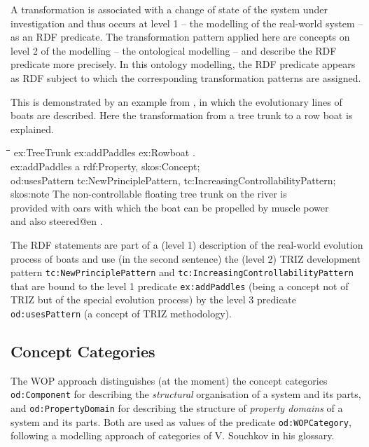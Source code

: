 \documentclass[11pt,a4paper]{article}
\newenvironment{code}{\tt \begin{tabbing}
\hskip12pt\=\hskip12pt\=\hskip12pt\=\hskip12pt\=\hskip5cm\=\hskip5cm\=\kill}
{\end{tabbing}}
\def\dq{{\char34}}
\begin{document}
A transformation is associated with a change of state of the system under
investigation and thus occurs at level 1 -- the modelling of the real-world
system -- as an RDF predicate. The transformation pattern applied here are
concepts on level 2 of the modelling -- the ontological modelling -- and
describe the RDF predicate more precisely. In this ontology modelling, the RDF
predicate appears as RDF subject to which the corresponding transformation
patterns are assigned.

This is demonstrated by an example from \cite[Fig. 4.20]{Koltze2017}, in which
the evolutionary lines of boats are described.  Here the transformation from a
tree trunk to a row boat is explained. 
\begin{code}
  ex:TreeTrunk ex:addPaddles ex:Rowboat .\\[4pt]

  ex:addPaddles a rdf:Property, skos:Concept;\\
  \>od:usesPattern tc:NewPrinciplePattern,
  tc:IncreasingControllabilityPattern;  \\
  \> skos:note {\dq}{\dq}{\dq}The non-controllable floating tree trunk on the
  river is \\\>\>provided with oars with which the boat can be propelled by
  muscle power \\\>\> and also steered{\dq}{\dq}{\dq}@en .
\end{code}
The RDF statements are part of a (level 1) description of the real-world
evolution process of boats and use (in the second sentence) the (level 2) TRIZ
development pattern \texttt{tc:NewPrinciplePattern} and
\texttt{tc:IncreasingControllabilityPattern} that are bound to the level 1
predicate \texttt{ex:addPaddles} (being a concept not of TRIZ but of the
special evolution process) by the level 3 predicate \texttt{od:usesPattern} (a
concept of TRIZ methodology).

\subsection{Concept Categories}

The WOP approach distinguishes (at the moment) the concept categories
\texttt{od:Component} for describing the \emph{structural} organisation of a
system and its parts, and \texttt{od:PropertyDomain} for describing the
structure of \emph{property domains} of a system and its parts.  Both are used
as values of the predicate \texttt{od:WOPCategory}, following a modelling
approach of categories of V. Souchkov in his glossary.
\end{document}
